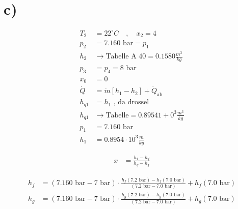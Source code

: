 

\section*{c)}

\begin{align*}
T_2 &= 22^\circ C \quad , \quad x_2 = 4 \\
p_2 &= 7.160 \text{ bar} = p_1 \\
h_2 &\rightarrow \text{Tabelle A 40} = 0.1580 \frac{m^3}{kg} \\
p_3 &= p_4 = 8 \text{ bar} \\
x_0 &= 0 \\
\dot{Q} &= \dot{m} \left[ h_1 - h_2 \right] + \dot{Q}_{\text{ab}} \\
h_{q1} &= h_1 \text{ , da drossel} \\
h_{q1} &\rightarrow \text{Tabelle} = 0.89541 + 0^3 \frac{m^3}{kg} \\
p_1 &= 7.160 \text{ bar} \\
h_1 &= 0.8954 \cdot 10^3 \frac{m}{kg}
\end{align*}

\begin{align*}
x &= \frac{h_1 - h_f}{h_g - h_f}
\end{align*}

\begin{align*}
h_f &= (7.160 \text{ bar} - 7 \text{ bar}) \cdot \frac{h_f(7.2 \text{ bar}) - h_f(7.0 \text{ bar})}{(7.2 \text{ bar} - 7.0 \text{ bar})} + h_f(7.0 \text{ bar}) \\
h_g &= (7.160 \text{ bar} - 7 \text{ bar}) \cdot \frac{h_g(7.2 \text{ bar}) - h_g(7.0 \text{ bar})}{(7.2 \text{ bar} - 7.0 \text{ bar})} + h_g(7.0 \text{ bar})
\end{align*}